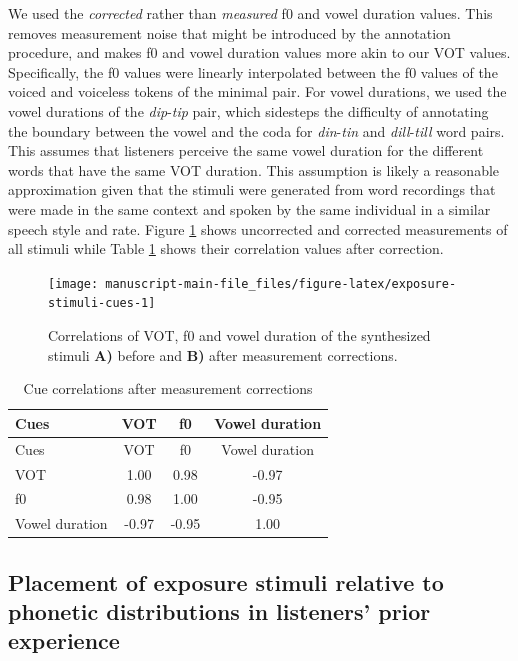\documentclass[
  11pt,
  man,mask,floatsintext]{apa6}
\begin{document}
We used the \emph{corrected} rather than \emph{measured} f0 and vowel duration values. This removes measurement noise that might be introduced by the annotation procedure, and makes f0 and vowel duration values more akin to our VOT values. Specifically, the f0 values were linearly interpolated between the f0 values of the voiced and voiceless tokens of the minimal pair. For vowel durations, we used the vowel durations of the \emph{dip}-\emph{tip} pair, which sidesteps the difficulty of annotating the boundary between the vowel and the coda for \emph{din}-\emph{tin} and \emph{dill}-\emph{till} word pairs. This assumes that listeners perceive the same vowel duration for the different words that have the same VOT duration. This assumption is likely a reasonable approximation given that the stimuli were generated from word recordings that were made in the same context and spoken by the same individual in a similar speech style and rate. Figure \ref{fig:exposure-stimuli-cues} shows uncorrected and corrected measurements of all stimuli while Table \ref{tab:exposure-stimuli-cue-correlations} shows their correlation values after correction.



\begin{figure}

{\centering \texttt{[image: manuscript-main-file\_files/figure-latex/exposure-stimuli-cues-1]} 

}

\caption{Correlations of VOT, f0 and vowel duration of the synthesized stimuli \textbf{A)} before and \textbf{B)} after measurement corrections.}\label{fig:exposure-stimuli-cues}
\end{figure}

\begin{longtable}[]{@{}lccc@{}}
\caption{\label{tab:exposure-stimuli-cue-correlations}Cue correlations after measurement corrections}\tabularnewline
\toprule\noalign{}
Cues & VOT & f0 & Vowel duration \\
\midrule\noalign{}
\endfirsthead
\toprule\noalign{}
Cues & VOT & f0 & Vowel duration \\
\midrule\noalign{}
\endhead
\bottomrule\noalign{}
\endlastfoot
VOT & 1.00 & 0.98 & -0.97 \\
f0 & 0.98 & 1.00 & -0.95 \\
Vowel duration & -0.97 & -0.95 & 1.00 \\
\end{longtable}

\subsection{Placement of exposure stimuli relative to phonetic distributions in listeners' prior experience}\label{sec:placement-of-exposure-stimuli}
\end{document}
